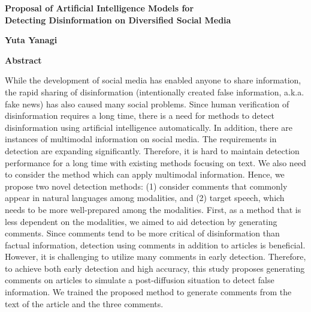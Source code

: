 \cleardoublepage
{} 
\thispagestyle{plain}
\begin{center}
    \Large
    \textbf{Proposal of Artificial Intelligence Models for\\Detecting Disinformation on Diversified Social Media}
        
    \vspace{0.4cm}
    \textbf{Yuta Yanagi}
       
    \vspace{0.9cm}
    \textbf{Abstract}
   
\end{center}
While the development of social media has enabled anyone to share information,
the rapid sharing of disinformation (intentionally created false information, a.k.a. fake news) has also caused many social problems.
Since human verification of disinformation requires a long time,
there is a need for methods to detect disinformation using artificial intelligence automatically.
In addition, there are instances of multimodal information on social media.
The requirements in detection are expanding significantly.
Therefore, it is hard to maintain detection performance for a long time with existing methods focusing on text. 
We also need to consider the method which can apply multimodal information.
Hence, we propose two novel detection methods: 
(1) consider comments that commonly appear in natural languages among modalities, and 
(2) target speech, which needs to be more well-prepared among the modalities. 
First, as a method that is less dependent on the modalities, we aimed to aid detection by generating comments.
Since comments tend to be more critical of disinformation than factual information, 
detection using comments in addition to articles is beneficial. 
However, it is challenging to utilize many comments in early detection. 
Therefore, to achieve both early detection and high accuracy,
this study proposes generating comments on articles to simulate a post-diffusion situation to detect false information.
We trained the proposed method to generate comments from the text of the article and the three comments.
